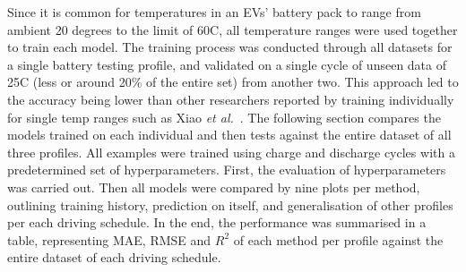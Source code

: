 %
Since it is common for temperatures in an EVs' battery pack to range from ambient 20 degrees to the limit of 60\textdegree{}C, all temperature ranges were used together to train each model.
The training process was conducted through all datasets for a single battery testing profile, and validated on a single cycle of unseen data of 25\textdegree{}C (less or around 20\% of the entire set) from another two. 
This approach led to the accuracy being lower than other researchers reported by training individually for single temp ranges such as Xiao \textit{et al.}~\cite{xiao_accurate_2019}.
The following section compares the models trained on each individual and then tests against the entire dataset of all three profiles.
All examples were trained using charge and discharge cycles with a predetermined set of hyperparameters. %
First, the evaluation of hyperparameters was carried out.
Then all models were compared by nine plots per method, outlining training history, prediction on itself, and generalisation of other profiles per each driving schedule.
In the end, the performance was summarised in a table, representing MAE, RMSE and $R^2$ of each method per profile against the entire dataset of each driving schedule.
%

%

